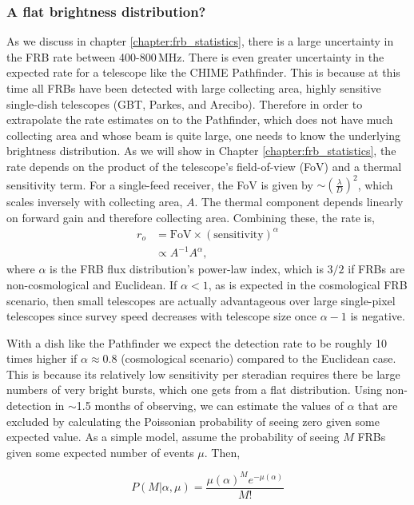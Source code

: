 \subsubsection{A flat brightness distribution?}
As we discuss in chapter \ref{chapter:frb_statistics}, there is 
a large uncertainty in the FRB rate between 400-800\,MHz. There 
is even greater uncertainty in the expected rate for a 
telescope like the CHIME Pathfinder. This is because at this time
all FRBs
have been detected with large collecting area, highly sensitive single-dish 
telescopes (GBT, Parkes, and Arecibo). Therefore in order to 
extrapolate the rate estimates on to the Pathfinder, which 
does not have much collecting area and whose beam is quite large, one 
needs to know the underlying brightness distribution. As we will show 
in Chapter \ref{chapter:frb_statistics}, the rate depends on the product 
of the telescope's field-of-view (FoV) and a thermal sensitivity term. 
For a single-feed receiver, the FoV is given by 
$\sim \left(\frac{\lambda}{D}\right)^2$, which scales inversely with 
collecting area, $A$. The thermal component depends linearly
on forward gain and therefore collecting area. Combining these, 
the rate is, 
\begin{align}
r_o &= \textrm{FoV} \times \left(\textrm{sensitivity}\right)^\alpha\\
     & \propto A^{-1} A^\alpha,
\end{align}
where $\alpha$ is the FRB flux distribution's power-law index, which is 
$3/2$ if FRBs are non-cosmological and Euclidean. If $\alpha < 1$, 
as is expected in the cosmological FRB scenario, then 
small telescopes are actually advantageous over large 
single-pixel telescopes since survey speed decreases with telescope size
once $\alpha-1$ is negative. 

With a dish like the Pathfinder
we expect the detection rate to be 
roughly 10 times higher if $\alpha\approx 0.8$ (cosmological scenario) 
compared to the Euclidean case. This is because its relatively 
low sensitivity per steradian requires there be large numbers 
of very bright bursts, which one gets from a flat distribution.
Using non-detection in $\sim$1.5 months of observing, we can 
estimate the values of $\alpha$ that are excluded 
by calculating the Poissonian probability of seeing zero 
given some expected value. As a simple model, assume
the probability of seeing $M$ FRBs given some expected 
number of events $\mu$. Then,

\begin{equation}
     P(M | \alpha, \mu) = \frac{\mu \left(\alpha\right)^M e^{-\mu(\alpha)}}{M!}
\end{equation}

